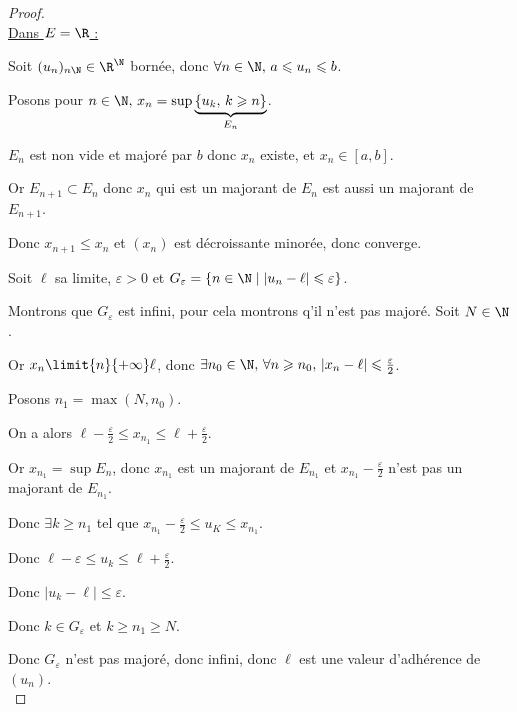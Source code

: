 \begin{proof}~\\
    \uline{Dans $E = \R$ :}

    Soit $(u_n)_{n \N} \in \R^{\N}$ bornée, donc $\forall n \in \N, \, a \leqslant u_n \leqslant b$. 

    Posons pour $n \in \N, \, x_n = \sup \underbrace{\{u_k, \, k \geqslant n\}}_{E_n}$.

    $E_n$ est non vide et majoré par $b$ donc $x_n$ existe, et $x_n \in [a, b]$.

    
    Or $E_{n + 1} \subset E_n$ donc $x_n$ qui est un majorant de $E_n$ est aussi un majorant de $E_{n + 1}$.

    Donc $x_{n + 1} \leqslant x_n$ et $(x_n)$ est décroissante minorée, donc converge. 

    Soit $\ell$ sa limite, $\varepsilon > 0$ et $G_\varepsilon = \{n \in \N \mid |u_n - \ell| \leqslant \varepsilon\}$.

    Montrons que $G_\varepsilon$ est infini, pour cela montrons q'il n'est pas majoré. Soit $N \in \N$.

    Or $x_n \limit{n}{+\infty} \ell$, donc $\exists n_0 \in \N, \, \forall n \geqslant n_0, \, |x_n - \ell| \leqslant \frac \varepsilon 2$.

    Posons $n_1 = \max(N, n_0)$.

    On a alors $\ell - \frac \varepsilon 2 \leqslant x_{n_1} \leqslant \ell + \frac \varepsilon 2$.

    Or $x_{n_1} = \sup E_n$, donc $x_{n_1} $ est un majorant de $E_{n_1}$ et 
    $x_{n_1} - \frac \varepsilon 2$ n'est pas un majorant de $E_{n_1}$.

    Donc $\exists k \geqslant n_1$ tel que $x_{n_1} - \frac \varepsilon 2 \leqslant u_K \leqslant x_{n_1}$.

    Donc $\ell - \varepsilon \leqslant u_k \leqslant \ell + \frac \varepsilon 2$.

    Donc $| u_k - \ell| \leqslant \varepsilon$. 

    Donc $k \in G_\varepsilon$ et $k \geqslant n_1 \geqslant N$.

    Donc $G_\varepsilon$ n'est pas majoré, donc infini, donc $\ell$ est une valeur d'adhérence de $(u_n)$. \\


\end{proof}
